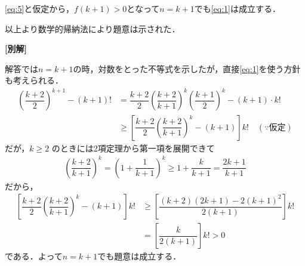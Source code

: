 \documentclass[../../main.tex]{subfiles}
\begin{document}
\cref{eq:5}と仮定から，$f(k+1)>0$となって$n=k+1$でも\cref{eq:1}は成立する．

以上より数学的帰納法により題意は示された．

{\bf [別解]}

解答では$n=k+1$の時，対数をとった不等式を示したが，直接\cref{eq:1}を使う方針も考えられる．
\begin{align}
  \left(\dfrac{k+2}{2}\right)^{k+1} - (k+1)!
  &= \dfrac{k+2}{2} \left(\dfrac{k+2}{k+1}\right)^k \left(\dfrac{k+1}{2}\right)^k - (k+1) \cdot k! \\
  &\ge \left[ \dfrac{k+2}{2} \left(\dfrac{k+2}{k+1}\right)^k - (k+1) \right] k! \quad (\because\text{仮定})
\end{align}
だが，$k \ge 2$ のときには2項定理から第一項を展開できて
\begin{align}
  \left(\dfrac{k+2}{k+1}\right)^k = \left(1 + \dfrac{1}{k+1}\right)^k \ge 1 + \dfrac{k}{k+1} = \dfrac{2k+1}{k+1}
\end{align}
だから，
\begin{align}
  \left[ \dfrac{k+2}{2} \left(\dfrac{k+2}{k+1}\right)^k - (k+1) \right] k!
  &\ge \left[ \dfrac{(k+2)(2k+1)-2(k+1)^2}{2(k+1)} \right] k! \\
  &= \left[\dfrac{k}{2(k+1)} \right] k! > 0
\end{align}
である．よって$n=k+1$でも題意は成立する．

\newpage
\end{document}
